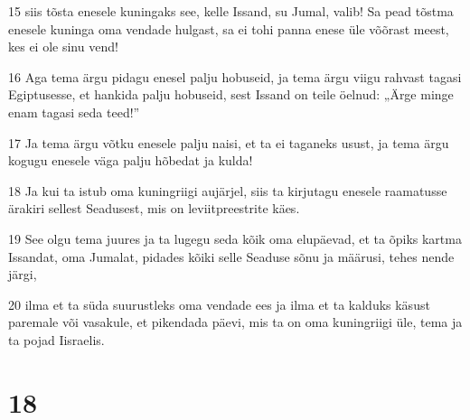 \par 15 siis tõsta enesele kuningaks see, kelle Issand, su Jumal, valib! Sa pead tõstma enesele kuninga oma vendade hulgast, sa ei tohi panna enese üle võõrast meest, kes ei ole sinu vend!
\par 16 Aga tema ärgu pidagu enesel palju hobuseid, ja tema ärgu viigu rahvast tagasi Egiptusesse, et hankida palju hobuseid, sest Issand on teile öelnud: „Ärge minge enam tagasi seda teed!”
\par 17 Ja tema ärgu võtku enesele palju naisi, et ta ei taganeks usust, ja tema ärgu kogugu enesele väga palju hõbedat ja kulda!
\par 18 Ja kui ta istub oma kuningriigi aujärjel, siis ta kirjutagu enesele raamatusse ärakiri sellest Seadusest, mis on leviitpreestrite käes.
\par 19 See olgu tema juures ja ta lugegu seda kõik oma elupäevad, et ta õpiks kartma Issandat, oma Jumalat, pidades kõiki selle Seaduse sõnu ja määrusi, tehes nende järgi,
\par 20 ilma et ta süda suurustleks oma vendade ees ja ilma et ta kalduks käsust paremale või vasakule, et pikendada päevi, mis ta on oma kuningriigi üle, tema ja ta pojad Iisraelis.

\chapter{18}

